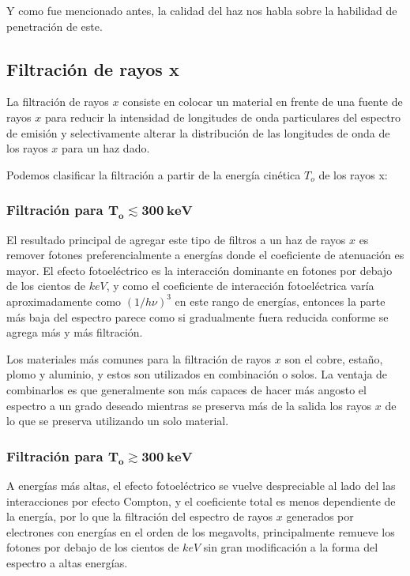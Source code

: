 Y como fue mencionado antes, la calidad del haz nos habla sobre la habilidad de penetración de este.


\subsection{Filtración de rayos x}
La filtración de rayos $x$ consiste en colocar un material en frente de una fuente de rayos $x$ para reducir la intensidad de longitudes de onda particulares del espectro de emisión y selectivamente alterar la distribución de las longitudes de onda de los rayos $x$ para un haz dado.

\cite{Xrayfilt39:online}

Podemos clasificar la filtración a partir de la energía cinética $T_o$ de los rayos x:

\subsubsection{Filtración para $\mathbf{T_o\lesssim 300 ~ keV}$}

El resultado principal de agregar este tipo de filtros a un haz de rayos $x$ es remover fotones preferencialmente a energías donde el coeficiente de atenuación es mayor. El efecto fotoeléctrico es la interacción dominante en fotones por debajo de los cientos de $keV$,
y como el coeficiente de interacción fotoeléctrica varía aproximadamente como $(1/h\nu)^3$ en este rango de energías, entonces la parte más baja del espectro parece como si gradualmente fuera reducida conforme se agrega más y más filtración.

Los materiales más comunes para la filtración de rayos $x$ son el cobre, estaño, plomo y aluminio, y estos son utilizados en combinación o solos. La ventaja de combinarlos es que generalmente son más capaces de hacer más angosto el espectro a un grado deseado mientras se preserva más de la salida los rayos $x$ de lo que se preserva utilizando un solo material.

\cite{attix2008introduction}

\subsubsection{Filtración para $\mathbf{T_o\gtrsim 300 ~ keV}$}

A energías más altas, el efecto fotoeléctrico se vuelve despreciable al lado del las interacciones por efecto Compton, y el coeficiente total es menos dependiente de la energía, por lo que la filtración del espectro de rayos $x$ generados por electrones con energías en el orden de los megavolts, principalmente remueve los fotones por debajo de los cientos de $keV$ sin gran modificación a la forma del espectro a altas energías.

